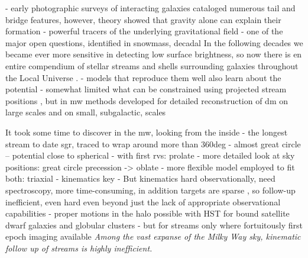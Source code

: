 \documentclass[final,5p,times,twocolumn,authoryear]{elsarticle}
\begin{document}
- early photographic surveys of interacting galaxies cataloged numerous tail and bridge features, however, theory showed that gravity alone can explain their formation
- powerful tracers of the underlying gravitational field
- one of the major open questions, identified in snowmass, decadal
In the following decades we became ever more sensitive in detecting low surface brightness, so now there is en entire compendium of stellar streams and shells surrounding galaxies throughout the Local Universe \citep{leduc, delgado, others}.
- models that reproduce them well also learn about the potential \citep{pearson, amorisco, vandokkum}
- somewhat limited what can be constrained using projected stream positions \citep{nibauer}, but in mw methods developed for detailed reconstruction of dm on large scales \citep{varghese, bonaca:2014} and on small, subgalactic, scales \citep{johnston, ibata}


It took some time to discover in the mw, looking from the inside
- the longest stream to date sgr, traced to wrap around more than 360deg \citep{majewski, belokurov}
- almost great circle -- potential close to spherical
- with first rvs: prolate \citep{helmi}
- more detailed look at sky positions: great circle precession -> oblate \citep{johnston}
- more flexible model employed to fit both: triaxial \citep{law, lmj, deg}
- kinematics key \citep{bh:2018, nibauer, pearson}
- But kinematics hard observationally, need spectroscopy, more time-consuming, in addition targets are sparse \citep{kuzma, etc}, so follow-up inefficient, even hard even beyond just the lack of appropriate observational capabilities
- proper motions in the halo possible with HST for bound satellite dwarf galaxies and globular clusters \citep{kallivayalil, vdmarel, sohn, watkins}
- but for streams only where fortuitously first epoch imaging available \citep{sohn}
\emph{Among the vast expanse of the Milky Way sky, kinematic follow up of streams is highly inefficient.}
\end{document}
